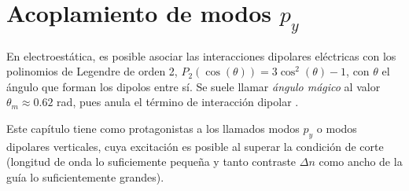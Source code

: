 \chapter{Acoplamiento de modos $p_y$}
En electroestática, es posible asociar las interacciones dipolares eléctricas con los polinomios de Legendre de orden 2, $P_2(\cos(\theta))=3\cos^2(\theta)-1$, con $\theta$ el ángulo que forman los dipolos entre sí. Se suele llamar \textit{ángulo mágico} al valor $\theta_m \approx 0.62$ rad, pues anula el término de interacción dipolar \citep{medmagic}. 

Este capítulo tiene como protagonistas a los llamados modos $p_y$ o modos dipolares verticales, cuya excitación es posible al superar la condición de corte (longitud de onda lo suficiemente pequeña y tanto contraste $\Delta n$ como ancho de la guía lo suficientemente grandes).



